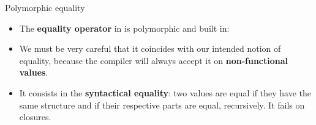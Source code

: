 %
\begin{frame}{Polymorphic equality}

  \begin{itemize}

    \item The \textbf{equality operator} in \OCaml is polymorphic and
      built in:

      \noindent\topin{(=)}

      \noindent{}

      \item We must be very careful that it coincides with our
        intended notion of equality, because the compiler will always
        accept it on \textbf{non\hyp{}functional values}.

      \item It consists in the \textbf{syntactical equality}: two
        values are equal if they have the same structure and if their
        respective parts are equal, recursively. It fails on closures.

        \smallskip

        \noindent{}

        \noindent{}

        \noindent{}


  \end{itemize}

\end{frame}
